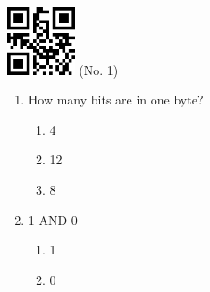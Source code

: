 \documentclass[twocolumn]{article}
\title{}
\date{}
\begin{document}

\begin{center}
 \hspace{0.2cm}
 \includegraphics[width=2cm]{qrcode-1.png}
 \hspace{0.5cm}
 \Large{  (No. 1) }
\end{center}



\begin{enumerate}



  \item How many bits are in one byte?

  \begin{enumerate}
   
   \item 4
   
   \item 12
   
   \item 8
   
  \end{enumerate}



  \item 1 AND 0

  \begin{enumerate}
   
   \item 1
   
   \item 0
   
  \end{enumerate}


\end{enumerate}


\end{document}
